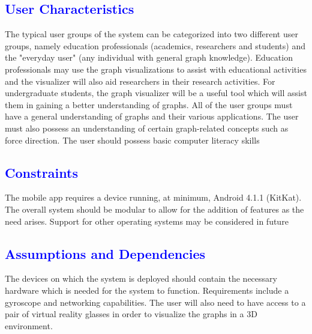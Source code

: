 \documentclass[12pt]{article}
\begin{document}
\textcolor{blue}{\subsection{User Characteristics}}
\begin{flushleft}
The typical user groups of the system can be categorized into two different user groups, namely education professionals (academics, researchers and students) and the "everyday user" (any individual with general graph knowledge). Education professionals may use the graph visualizations to assist with educational activities and the visualizer will also aid researchers in their research activities. For undergraduate students, the graph visualizer will be a useful tool which will assist them in gaining a better understanding of graphs. All of the user groups must have a general understanding of graphs and their various applications. The user must also possess an understanding of certain graph-related concepts such as force direction. The user should possess basic computer literacy skills
\end{flushleft}

\textcolor{blue}{\subsection{Constraints}}
\begin{flushleft}
 The mobile app requires a device running, at minimum, Android 4.1.1 (KitKat). The overall system should be modular to allow for the addition of features as the need arises. Support for other operating systems may be considered in future
\end{flushleft}

\textcolor{blue}{\subsection{Assumptions and Dependencies}}
\begin{flushleft}
The devices on which the system is deployed should contain the necessary hardware which is needed for the system to function. Requirements include a gyroscope and networking capabilities. The user will also need to have access to a pair of virtual reality glasses in order to visualize the graphs in a 3D environment.
\end{flushleft}
\end{document}
